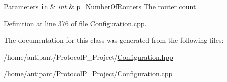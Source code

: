 \begin{DoxyParams}[1]{Parameters}
\mbox{\tt in}  & {\em int} & p\-\_\-\-Number\-Of\-Routers The router count \\
\hline
\end{DoxyParams}


Definition at line 376 of file Configuration.\-cpp.



The documentation for this class was generated from the following files\-:\begin{DoxyCompactItemize}
\item 
/home/antipant/\-Protocol\-P\-\_\-\-Project/\hyperlink{Configuration_8hpp}{Configuration.\-hpp}\item 
/home/antipant/\-Protocol\-P\-\_\-\-Project/\hyperlink{Configuration_8cpp}{Configuration.\-cpp}\end{DoxyCompactItemize}
